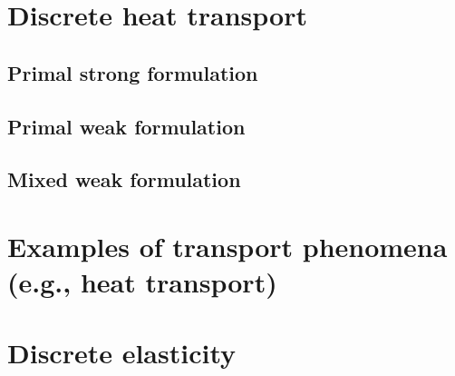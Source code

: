 \documentclass[fleqn]{article}
\theoremstyle{definition}
\begin{document}
\section{Discrete heat transport}
\label{section:discrete_heat_transport}


\subsection{Primal strong formulation}
\phantom{T}



\subsection{Primal weak formulation}
\phantom{T}

\subsection{Mixed weak formulation}
\phantom{T}



\section{Examples of transport phenomena (e.g., heat transport)}
\label{section:examples_of_transport_phenomena}







\section{Discrete elasticity}
\label{section:discrete_elasticity}


\end{document}
